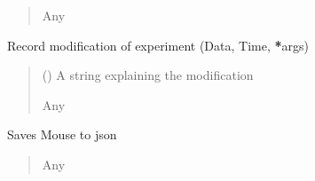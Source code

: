 \documentclass[letterpaper,10pt,english]{sphinxmanual}
\begin{document}
\begin{fulllineitems}
\begin{fulllineitems}
\begin{quote}
\begin{description}
\begin{itemize}
\end{itemize}

\sphinxAtStartPar
Any

\end{description}\end{quote}

\end{fulllineitems}


\begin{fulllineitems}
\label{\detokenize{Organization:Organization.Mouse.record_mod}}
\pysigstartsignatures
{}
\pysigstopsignatures
\sphinxAtStartPar
Record modification of experiment (Data, Time, {\color{red}\bfseries{}*}args)
\begin{quote}\begin{description}
\sphinxAtStartPar
{} () \textendash{} A string explaining the modification

\sphinxAtStartPar
Any

\end{description}\end{quote}

\end{fulllineitems}


\begin{fulllineitems}
\label{\detokenize{Organization:Organization.Mouse.save}}
\pysigstartsignatures
{}
\pysigstopsignatures
\sphinxAtStartPar
Saves Mouse to json
\begin{quote}\begin{description}
\sphinxAtStartPar
Any

\end{description}\end{quote}

\end{fulllineitems}


\end{fulllineitems}
\end{document}
